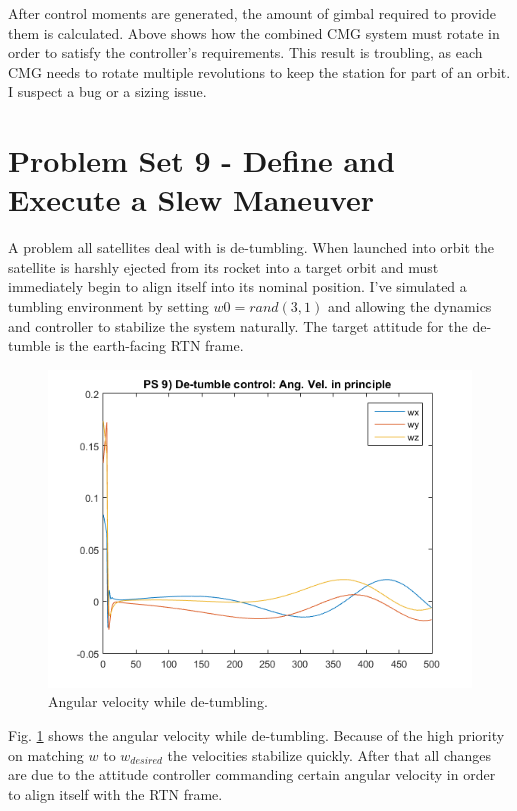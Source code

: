\documentclass[12pt, letterpaper]{article}
\begin{document}
After control moments are generated, the amount of gimbal required to provide them is calculated. Above shows how the combined CMG system must rotate in order to satisfy the controller's requirements. This result is troubling, as each CMG needs to rotate multiple revolutions to keep the station for part of an orbit. I suspect a bug or a sizing issue.



\section{Problem Set 9 - Define and Execute a Slew Maneuver}
A problem all satellites deal with is de-tumbling. When launched into orbit the satellite is harshly ejected from its rocket into a target orbit and must immediately begin to align itself into its nominal position. I've simulated a tumbling environment by setting $w0=rand(3,1)$ and allowing the dynamics and controller to stabilize the system naturally. The target attitude for the de-tumble is the earth-facing RTN frame.


\begin{figure}[H]
	\centering
	\includegraphics[scale=0.9]{ps9_01}
	\caption{Angular velocity while de-tumbling.}
	\label{9:angvel}
\end{figure}

Fig. \ref{9:angvel} shows the angular velocity while de-tumbling. Because of the high priority on matching $w$ to $w_{desired}$ the velocities stabilize quickly. After that all changes are due to the attitude controller commanding certain angular velocity in order to align itself with the RTN frame.
\end{document}

